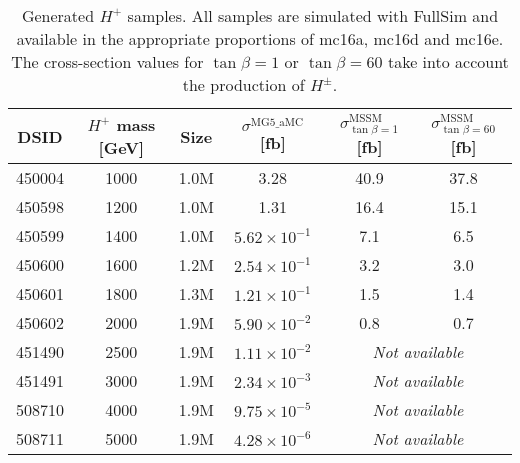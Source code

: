 \begin{table}[H]
  \centering
  \begin{tabular*}{170mm}{@{\extracolsep{\fill}}cccccc}
    \hline\hline
    DSID   & $H^{+}$ mass [GeV] & Size & ${\sigma}^{\text{MG5\_aMC}}$ [fb] & ${\sigma}_{\tan{\beta}=1}^{\text{MSSM}}$ [fb] & ${\sigma}_{\tan{\beta}=60}^{\text{MSSM}}$ [fb]\\
    \hline
    450004 & 1000 & 1.0M & 3.28                  & 40.9 & 37.8\\
    450598 & 1200 & 1.0M & 1.31                  & 16.4 & 15.1\\
    450599 & 1400 & 1.0M & $5.62{\times}10^{-1}$ &  7.1 &  6.5\\
    450600 & 1600 & 1.2M & $2.54{\times}10^{-1}$ &  3.2 &  3.0\\
    450601 & 1800 & 1.3M & $1.21{\times}10^{-1}$ &  1.5 &  1.4\\
    450602 & 2000 & 1.9M & $5.90{\times}10^{-2}$ &  0.8 &  0.7\\
    451490 & 2500 & 1.9M & $1.11{\times}10^{-2}$ & \multicolumn{2}{c}{\textit{Not available}}\\
    451491 & 3000 & 1.9M & $2.34{\times}10^{-3}$ & \multicolumn{2}{c}{\textit{Not available}}\\     
    508710 & 4000 & 1.9M & $9.75{\times}10^{-5}$ & \multicolumn{2}{c}{\textit{Not available}}\\     
    508711 & 5000 & 1.9M & $4.28{\times}10^{-6}$ & \multicolumn{2}{c}{\textit{Not available}}\\     
    \hline\hline
  \end{tabular*}
  \caption{Generated $H^{+}$ samples. All samples are simulated with FullSim and available in the appropriate proportions of mc16a, mc16d and mc16e. The cross-section values for $\tan{\beta}=1$ or $\tan{\beta}=60$ take into account the production of $H^{\pm}$.}
  \label{tab:SignalSamples}
\end{table}

{}
